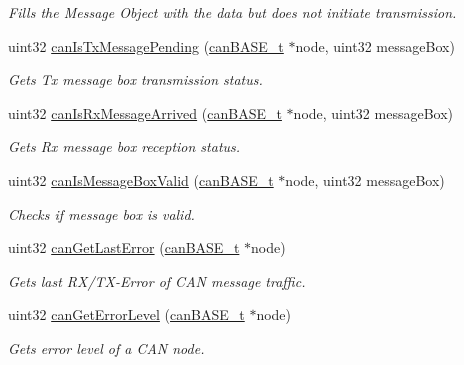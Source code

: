 \begin{DoxyCompactItemize}
\begin{DoxyCompactList}\small\item\em Fills the Message Object with the data but does not initiate transmission. \end{DoxyCompactList}\item 
uint32 \mbox{\hyperlink{group__CAN_ga90c2fd9d51bca56e652da71570099295}{can\+Is\+Tx\+Message\+Pending}} (\mbox{\hyperlink{reg__can_8h_a54ace0879c28a425474845a63d662c05}{can\+B\+A\+S\+E\+\_\+t}} $\ast$node, uint32 message\+Box)
\begin{DoxyCompactList}\small\item\em Gets Tx message box transmission status. \end{DoxyCompactList}\item 
uint32 \mbox{\hyperlink{group__CAN_ga5c0dda98d1341dbae341b4b6ea73a478}{can\+Is\+Rx\+Message\+Arrived}} (\mbox{\hyperlink{reg__can_8h_a54ace0879c28a425474845a63d662c05}{can\+B\+A\+S\+E\+\_\+t}} $\ast$node, uint32 message\+Box)
\begin{DoxyCompactList}\small\item\em Gets Rx message box reception status. \end{DoxyCompactList}\item 
uint32 \mbox{\hyperlink{group__CAN_gae353977bb29792a4297cb4ece4fd7e9c}{can\+Is\+Message\+Box\+Valid}} (\mbox{\hyperlink{reg__can_8h_a54ace0879c28a425474845a63d662c05}{can\+B\+A\+S\+E\+\_\+t}} $\ast$node, uint32 message\+Box)
\begin{DoxyCompactList}\small\item\em Checks if message box is valid. \end{DoxyCompactList}\item 
uint32 \mbox{\hyperlink{group__CAN_ga1c340f76d9eb647dbc6d01db099b0431}{can\+Get\+Last\+Error}} (\mbox{\hyperlink{reg__can_8h_a54ace0879c28a425474845a63d662c05}{can\+B\+A\+S\+E\+\_\+t}} $\ast$node)
\begin{DoxyCompactList}\small\item\em Gets last R\+X/\+T\+X-\/\+Error of C\+AN message traffic. \end{DoxyCompactList}\item 
uint32 \mbox{\hyperlink{group__CAN_gaf4802fe6abe62c1ca43e118438dd48c3}{can\+Get\+Error\+Level}} (\mbox{\hyperlink{reg__can_8h_a54ace0879c28a425474845a63d662c05}{can\+B\+A\+S\+E\+\_\+t}} $\ast$node)
\begin{DoxyCompactList}\small\item\em Gets error level of a C\+AN node. \end{DoxyCompactList}\item 

\end{DoxyCompactItemize}
